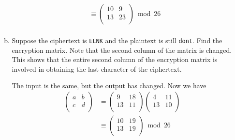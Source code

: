 \documentclass[12pt]{amsart}
\theoremstyle{plain}
\theoremstyle{definition}
\begin{document}
\begin{enumerate}[1.]
\begin{enumerate}[a.]
\begin{framed}
\begin{align*}
		&\equiv \left( \begin{array}{rr}10&9\\13&23\\\end{array}\right) \bmod 26\\
		\end{align*}
		\end{framed}
		\item Suppose the ciphertext is \texttt{ELNK} and the plaintext is still \texttt{dont}.  Find the encryption matrix.  Note that the second column of the matrix is changed.  This shows that the entire second column of the encryption matrix is involved in obtaining the last character of the ciphertext.
		\begin{framed}
		The input is the same, but the output has changed.  Now we have
		\begin{align*}
		\left( \begin{array}{rr}a&b\\c&d\\\end{array}\right) &= \left( \begin{array}{rr}9&18\\13&11\\\end{array}\right)\left( \begin{array}{rr}4&11\\13&10\\\end{array}\right)\\
		&\equiv \left( \begin{array}{rr}10&19\\13&19\\\end{array}\right) \bmod 26\\
		\end{align*}
		\end{framed}
		\end{enumerate}

\end{enumerate}

	
\end{document}
